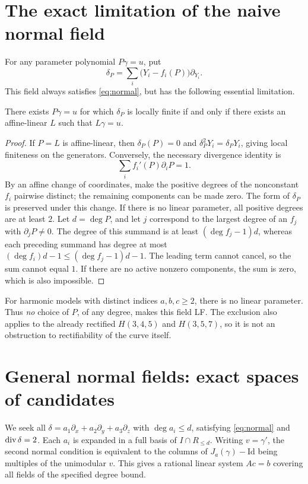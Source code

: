 \section{The exact limitation of the naive normal field}
For any parameter polynomial $P\gamma=u$, put
\[
\delta_P=\sum_i\bigl(Y_i-f_i(P)\bigr)\partial_{Y_i}.
\]
This field always satisfies \eqref{eq:normal}, but has the following
essential limitation.

\begin{theorem}
There exists $P\gamma=u$ for which $\delta_P$ is locally finite
if and only if there exists an affine-linear $L$ such that
$L\gamma=u$.
\end{theorem}
\begin{proof}
If $P=L$ is affine-linear, then $\delta_P(P)=0$ and
$\delta_P^2Y_i=\delta_PY_i$, giving local finiteness on the generators.
Conversely, the necessary divergence identity is
\[
\sum_i f_i'(P)\partial_iP=1.
\]
By an affine change of coordinates, make the positive degrees of the
nonconstant $f_i$ pairwise distinct; the remaining components can be made zero.
The form of $\delta_P$ is preserved under this change. If there is no linear
parameter, all positive degrees are at least $2$.
Let $d=\deg P$, and let $j$ correspond to the largest degree of an $f_j$
with $\partial_jP\ne0$. The degree of this summand is at least
$(\deg f_j-1)d$, whereas each preceding summand has degree at most
$(\deg f_i)d-1\le(\deg f_j-1)d-1$.
The leading term cannot cancel, so the sum cannot equal $1$.
If there are no active nonzero components, the sum is zero,
which is also impossible.
\end{proof}

For harmonic models with distinct indices $a,b,c\ge2$, there is no
linear parameter. Thus \emph{no} choice of $P$, of any degree,
makes this field LF. The exclusion also applies to the already rectified
$H(3,4,5)$ and $H(3,5,7)$, so it is not an obstruction to rectifiability
of the curve itself.

\section{General normal fields: exact spaces of candidates}
We seek all $\delta=a_1\partial_x+a_2\partial_y+a_3\partial_z$ with
$\deg a_i\le d$, satisfying \eqref{eq:normal} and $\operatorname{div}\delta=2$.
Each $a_i$ is expanded in a full basis of $I\cap R_{\le d}$.
Writing $v=\gamma'$, the second normal condition is equivalent to
the columns of $J_a(\gamma)-\mathrm{Id}$ being multiples of the unimodular $v$.
This gives a rational linear system $Ac=b$ covering
all fields of the specified degree bound.

